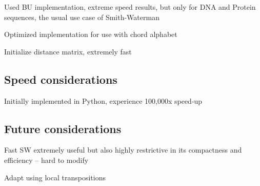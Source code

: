 \item Used BU implementation, extreme speed results, but only for DNA and Protein sequences, the usual use case of Smith-Waterman

\item Optimized implementation for use with chord alphabet

\item Initialize distance matrix, extremely fast

\subsection{Speed considerations}

\item Initially implemented in Python, experience 100,000x speed-up

\subsection{Future considerations}

\item Fast SW extremely useful but also highly restrictive in its compactness and efficiency -- hard to modify

\item Adapt using local transpositions